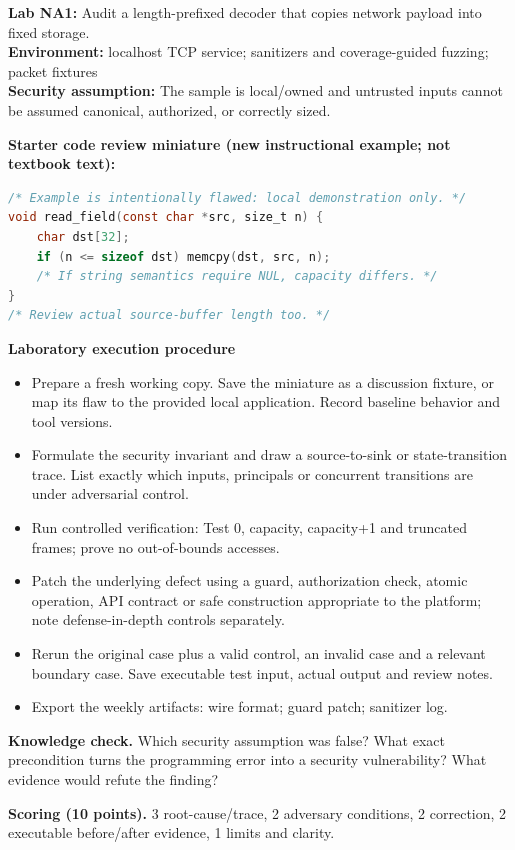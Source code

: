 \documentclass[10pt,letterpaper]{article}
\begin{document}
\begin{insight}\textbf{Lab NA1:} Audit a length-prefixed decoder that copies network payload into fixed storage.\\\textbf{Environment:} localhost TCP service; sanitizers and coverage-guided fuzzing; packet fixtures\\\textbf{Security assumption:} The sample is local/owned and untrusted inputs cannot be assumed canonical, authorized, or correctly sized.\end{insight}
\textbf{Starter code review miniature (new instructional example; not textbook text):}
\begin{lstlisting}[language=C]
/* Example is intentionally flawed: local demonstration only. */
void read_field(const char *src, size_t n) {
    char dst[32];
    if (n <= sizeof dst) memcpy(dst, src, n);
    /* If string semantics require NUL, capacity differs. */
}
/* Review actual source-buffer length too. */
\end{lstlisting}
\textbf{Laboratory execution procedure}
\begin{itemize}[leftmargin=*,itemsep=2pt]
\item Prepare a fresh working copy. Save the miniature as a discussion fixture, or map its flaw to the provided local application. Record baseline behavior and tool versions.
\item Formulate the security invariant and draw a source-to-sink or state-transition trace. List exactly which inputs, principals or concurrent transitions are under adversarial control.
\item Run controlled verification: Test 0, capacity, capacity+1 and truncated frames; prove no out-of-bounds accesses.
\item Patch the underlying defect using a guard, authorization check, atomic operation, API contract or safe construction appropriate to the platform; note defense-in-depth controls separately.
\item Rerun the original case plus a valid control, an invalid case and a relevant boundary case. Save executable test input, actual output and review notes.
\item Export the weekly artifacts: wire format; guard patch; sanitizer log.
\end{itemize}
\textbf{Knowledge check.} Which security assumption was false? What exact precondition turns the programming error into a security vulnerability? What evidence would refute the finding?

\textbf{Scoring (10 points).} 3 root-cause/trace, 2 adversary conditions, 2 correction, 2 executable before/after evidence, 1 limits and clarity.
\end{document}
